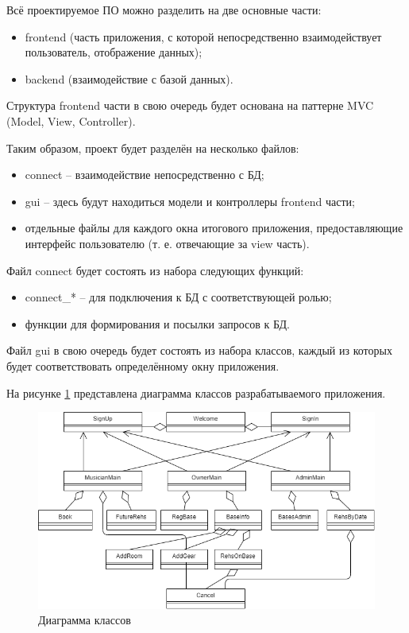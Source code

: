 Всё проектируемое ПО можно разделить на две основные части:
\begin{itemize}
	\item frontend (часть приложения, с которой непосредственно взаимодействует пользователь, отображение данных);
	\item backend (взаимодействие с базой данных).
\end{itemize}

Структура frontend части в свою очередь будет основана на паттерне MVC (Model, View, Controller).

Таким образом, проект будет разделён на несколько файлов:
\begin{itemize}
	\item connect – взаимодействие непосредственно с БД;
	\item gui – здесь будут находиться модели и контроллеры frontend части;
	\item отдельные файлы для каждого окна итогового приложения, предоставляющие интерфейс пользователю (т. е. отвечающие за view часть).
\end{itemize}

Файл connect будет состоять из набора следующих функций:
\begin{itemize}
	\item connect\_* – для подключения к БД с соответствующей ролью;
	\item функции для формирования и посылки запросов к БД.
\end{itemize}

Файл gui в свою очередь будет состоять из набора классов, каждый из которых будет соответствовать определённому окну приложения.

На рисунке \ref{img:classes} представлена диаграмма классов разрабатываемого приложения.

\begin{figure}[h!]
	\begin{center}
		\includegraphics[scale=0.6]{inc/img/Classes.png}
	\end{center}
	\captionsetup{justification=centering}
	\caption{Диаграмма классов}
	\label{img:classes}
\end{figure}

